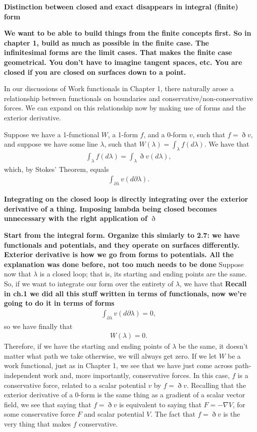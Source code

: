 \documentclass{book}
\begin{document}
\textbf{Distinction between closed and exact disappears in integral (finite) form}

\textbf{We want to be able to build things from the finite concepts first. So in chapter 1, build as much as possible in the finite case. The infinitesimal forms are the limit cases. That makes the finite case geometrical. You don't have to imagine tangent spaces, etc. You are closed if you are closed on surfaces down to a point.}

In our discussions of Work functionals in Chapter 1, there naturally arose a relationship between functionals on boundaries and conservative/non-conservative forces. We can expand on this relationship now by making use of forms and the exterior derivative. 

Suppose we have a 1-functional $W$, a 1-form $f$, and a 0-form $v$, such that $f = \eth v$, and suppose we have some line $\lambda$, such that $W(\lambda) = \int_\lambda f(d\lambda)$. We have that \begin{gather}\int_\lambda f(d\lambda) = \int_\lambda \eth v(d\lambda),\end{gather} which, by Stokes' Theorem, equals \begin{gather} \int_{\partial\lambda} v(d\partial\lambda).\end{gather}

\textbf{Integrating on the closed loop is directly integrating over the exterior derivative of a thing. Imposing lambda being closed becomes unnecessary with the right application of $\eth$}

\textbf{Start from the integral form. Organize this simiarly to 2.7: we have functionals and potentials, and they operate on surfaces differently. Exterior derivative is how we go from forms to potentials. All the explanation was done before, not too much needs to be done}
Suppose now that $\lambda$ is a closed loop; that is, its starting and ending points are the same. So, if we want to integrate our form over the entirety of $\lambda$, we have that \textbf{Recall in ch.1 we did all this stuff written in terms of functionals, now we're going to do it in terms of forms}\begin{gather} \int_{\partial\lambda} v(d\partial\lambda) = 0,\end{gather} so we have finally that \begin{gather} W(\lambda) = 0.\end{gather} Therefore, if we have the starting and ending points of $\lambda$ be the same, it doesn't matter what path we take otherwise, we will always get zero. If we let $W$ be a work functional, just as in Chapter 1, we see that we have just come across path-independent work and, more importantly, conservative forces. In this case, $f$ is a conservative force, related to a scalar potential $v$ by $f = \eth v$. Recalling that the exterior derivative of a 0-form is the same thing as a gradient of a scalar vector field, we see that saying that $f = \eth v$ is equivalent to saying that $F = -\nabla V$, for some conservative force $F$ and scalar potential $V$. The fact that $f = \eth v$ is the very thing that makes $f$ conservative.  
\end{document}
